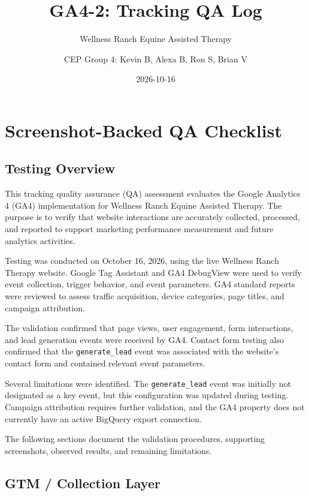 \documentclass[
  letterpaper,
  DIV=11,
  numbers=noendperiod]{scrartcl}
\title{GA4-2: Tracking QA Log}
\subtitle{Wellness Ranch Equine Assisted Therapy}
\author{CEP Group 4: Kevin B, Alexa B, Ron S, Brian V}
\date{2026-10-16}
\renewcommand*\contentsname{Table of contents}
\newcommand\contentsname{Table of contents}
\begin{document}
\maketitle

\renewcommand*\contentsname{Table of contents}
{
\setcounter{tocdepth}{3}
\tableofcontents
}

\section{Screenshot-Backed QA
Checklist}\label{screenshot-backed-qa-checklist}

\subsection{Testing Overview}\label{testing-overview}

This tracking quality assurance (QA) assessment evaluates the Google
Analytics 4 (GA4) implementation for Wellness Ranch Equine Assisted
Therapy. The purpose is to verify that website interactions are
accurately collected, processed, and reported to support marketing
performance measurement and future analytics activities.

Testing was conducted on October 16, 2026, using the live Wellness Ranch
Therapy website. Google Tag Assistant and GA4 DebugView were used to
verify event collection, trigger behavior, and event parameters. GA4
standard reports were reviewed to assess traffic acquisition, device
categories, page titles, and campaign attribution.

The validation confirmed that page views, user engagement, form
interactions, and lead generation events were received by GA4. Contact
form testing also confirmed that the \texttt{generate\_lead} event was
associated with the website's contact form and contained relevant event
parameters.

Several limitations were identified. The \texttt{generate\_lead} event
was initially not designated as a key event, but this configuration was
updated during testing. Campaign attribution requires further
validation, and the GA4 property does not currently have an active
BigQuery export connection.

The following sections document the validation procedures, supporting
screenshots, observed results, and remaining limitations.

\subsection{GTM / Collection Layer}\label{gtm-collection-layer}
\end{document}
